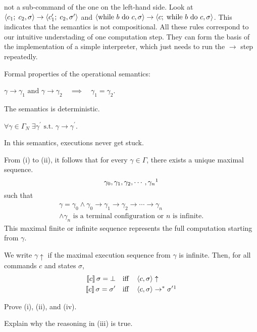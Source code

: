 \begin{enumcirc}
	not a sub-command of the one on the left-hand side.
	Look at
	$ \left\langle c_1 ;\; c_2, \sigma \right\rangle
		\rightarrow
		\left\langle c_1^\prime ;\; c_2, \sigma^\prime \right\rangle $
	and
	$ \left\langle \textrm{while } b \textrm{ do } c, \sigma \right\rangle
		\rightarrow
		\left\langle c ;\; \textrm{while } b \textrm{ do } c, \sigma \right\rangle $.
	This indicates that the semantics is not compositional.
	All these rules correspond to our intuitive understading of one computation
	step.
	They can form the basis of the implementation of a simple interpreter, which
	just needs to run the $\rightarrow$ step repeatedly.
	\item
	Formal properties of the operational semantics:
	\begin{enumrm}
		\item
		$\gamma \rightarrow \gamma_1
			\textrm{ and }
			\gamma \rightarrow \gamma_2
			\quad\implies\quad
			\gamma_1 = \gamma_2$.

		The semantics is deterministic.
		\item
		$\forall \gamma \in \Gamma_N \; \exists \gamma^\prime
			\textrm{ s.t. }
			\gamma \rightarrow \gamma^\prime$.

		In this semantics, executions never get stuck.
		\item
		From (i) to (ii), it follows that for every
		$\gamma \in \Gamma$,
		there exists a unique maximal sequence.
		\[
			\gamma_0, \gamma_1, \gamma_2, \cdots, \gamma_n\footnotemark
		\]
		such that
		\begin{multline*}
			\gamma = \gamma_0 \wedge
			\gamma_0 \rightarrow \gamma_1 \rightarrow \gamma_2 \rightarrow \cdots
			\rightarrow \gamma_n
			\\ \wedge \gamma_n \textrm{ is a terminal configuration or } n \textrm{ is infinite}.
		\end{multline*}
		This maximal finite or infinite sequence represents the full computation
		starting from $\gamma$.
		\item
		We write $\gamma \uparrow$ if the maximal execution sequence from $\gamma$ is
		infinite.
		Then, for all commands $c$ and states $\sigma$,
		\begin{align*}
			\bbrackets{c}\sigma = \bot          &
			\quad \textrm{iff} \quad
			\chevrons{c, \sigma} \uparrow         \\
			\bbrackets{c}\sigma = \sigma^\prime &
			\quad \textrm{iff} \quad
			\chevrons{c, \sigma} \rightarrow^* \sigma^\prime \footnotemark
		\end{align*}
	\end{enumrm}
	\begin{exercise}
		Prove (i), (ii), and (iv).
	\end{exercise}
	\begin{exercise}
		Explain why the reasoning in (iii) is true.
	\end{exercise}
\end{enumcirc}

